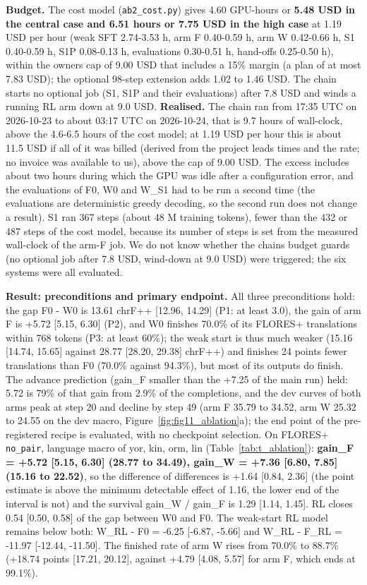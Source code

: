 \textbf{Budget.} The cost model (\texttt{ab2\_cost.py}) gives 4.60 GPU-hours or \textbf{5.48 USD in the central case and 6.51 hours or 7.75 USD in the high case} at 1.19 USD per hour (weak SFT 2.74-3.53 h, arm F 0.40-0.59 h, arm W 0.42-0.66 h, S1 0.40-0.59 h, S1P 0.08-0.13 h, evaluations 0.30-0.51 h, hand-offs 0.25-0.50 h), within the owner\textquotesingle s cap of 9.00 USD that includes a 15\% margin (a plan of at most 7.83 USD); the optional 98-step extension adds 1.02 to 1.46 USD. The chain starts no optional job (S1, S1P and their evaluations) after 7.8 USD and winds a running RL arm down at 9.0 USD. \textbf{Realised.} The chain ran from 17:35 UTC on 2026-10-23 to about 03:17 UTC on 2026-10-24, that is 9.7 hours of wall-clock, above the 4.6-6.5 hours of the cost model; at 1.19 USD per hour this is about 11.5 USD if all of it was billed (derived from the project lead\textquotesingle s times and the rate; no invoice was available to us), above the cap of 9.00 USD. The excess includes about two hours during which the GPU was idle after a configuration error, and the evaluations of F0, W0 and W\_S1 had to be run a second time (the evaluations are deterministic greedy decoding, so the second run does not change a result). S1 ran 367 steps (about 48 M training tokens), fewer than the 432 or 487 steps of the cost model, because its number of steps is set from the measured wall-clock of the arm-F job. We do not know whether the chain\textquotesingle s budget guards (no optional job after 7.8 USD, wind-down at 9.0 USD) were triggered; the six systems were all evaluated.

\textbf{Result: preconditions and primary endpoint.} All three preconditions hold: the gap F0 - W0 is 13.61 chrF++ {[}12.96, 14.29{]} (P1: at least 3.0), the gain of arm F is +5.72 {[}5.15, 6.30{]} (P2), and W0 finishes 70.0\% of its FLORES+ translations within 768 tokens (P3: at least 60\%); the weak start is thus much weaker (15.16 {[}14.74, 15.65{]} against 28.77 {[}28.20, 29.38{]} chrF++) and finishes 24 points fewer translations than F0 (70.0\% against 94.3\%), but most of its outputs do finish. The advance prediction (gain\_F smaller than the +7.25 of the main run) held: 5.72 is 79\% of that gain from 2.9\% of the completions, and the dev curves of both arms peak at step 20 and decline by step 49 (arm F 35.79 to 34.52, arm W 25.32 to 24.55 on the dev macro, Figure~\ref{fig:fig11_ablation}a); the end point of the pre-registered recipe is evaluated, with no checkpoint selection. On FLORES+ \texttt{no\_pair}, language macro of yor, kin, orm, lin (Table~\ref{tab:t_ablation}): \textbf{gain\_F = +5.72 {[}5.15, 6.30{]} (28.77 to 34.49), gain\_W = +7.36 {[}6.80, 7.85{]} (15.16 to 22.52)}, so the difference of differences is +1.64 {[}0.84, 2.36{]} (the point estimate is above the minimum detectable effect of 1.16, the lower end of the interval is not) and the survival gain\_W / gain\_F is 1.29 {[}1.14, 1.45{]}. RL closes 0.54 {[}0.50, 0.58{]} of the gap between W0 and F0. The weak-start RL model remains below both: W\_RL - F0 = -6.25 {[}-6.87, -5.66{]} and W\_RL - F\_RL = -11.97 {[}-12.44, -11.50{]}. The finished rate of arm W rises from 70.0\% to 88.7\% (+18.74 points {[}17.21, 20.12{]}, against +4.79 {[}4.08, 5.57{]} for arm F, which ends at 99.1\%).

